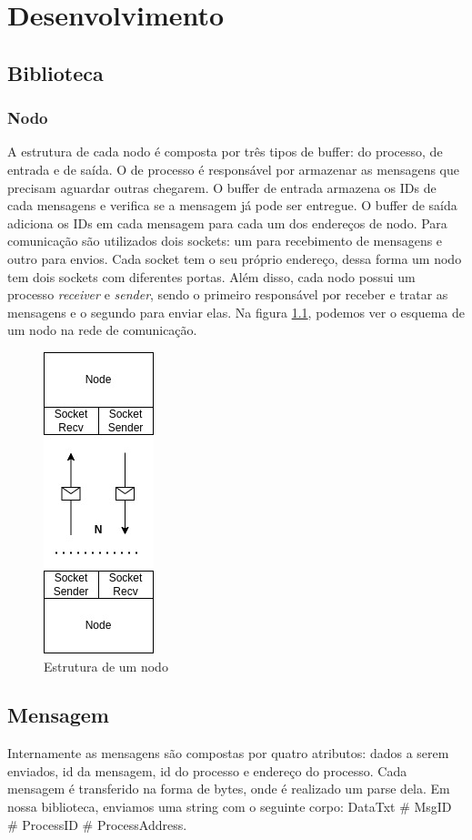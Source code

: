 \documentclass[
	12pt,				%
	openright,			%
	oneside,			%
	a4paper,			%
	english,			%
	french,				%
	spanish,			%
	brazil				%
	]{abntex2}
\begin{document}
\chapter{Desenvolvimento}
\section{Biblioteca}
\subsection{Nodo}

A estrutura de cada nodo é composta por três tipos de buffer: do processo, de entrada e de saída.
O de processo é responsável por armazenar as mensagens que precisam aguardar outras chegarem.
O buffer de entrada armazena os IDs de cada mensagens e verifica se a mensagem já pode ser entregue.
O buffer de saída adiciona os IDs em cada mensagem para cada um dos endereços de nodo.
Para comunicação são utilizados dois sockets: um para recebimento de
mensagens e outro para envios. Cada socket tem o seu próprio endereço,
dessa forma um nodo tem dois sockets com diferentes portas. Além disso,
cada nodo possui um processo \emph{receiver} e \emph{sender}, sendo o primeiro
responsável por receber e tratar as mensagens e o segundo para enviar elas.
Na figura \ref{fig:nodo}, podemos ver o esquema de um nodo na rede de comunicação.

\begin{figure}[!h]
    \centering
    \includegraphics[scale=0.9]{node.jpg}
    \caption{Estrutura de um nodo}
    \label{fig:nodo}
\end{figure}

\section{Mensagem}
Internamente as mensagens são compostas por quatro atributos: dados a serem enviados, id da mensagem,
id do processo e endereço do processo. Cada mensagem é transferido na forma de bytes,
onde é realizado um parse dela. Em nossa biblioteca, enviamos uma string com o seguinte
corpo: DataTxt \# MsgID \# ProcessID \# ProcessAddress.
\end{document}
